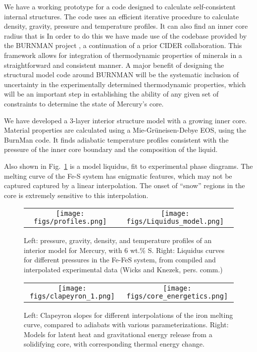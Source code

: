 We have a working prototype for a code designed to calculate self-consistent
internal structures. The code uses an efficient iterative procedure to
calculate density, gravity, pressure and temperature profiles. It can also find
an inner core radius that is In order to do this we have made use of the
codebase provided by the BURNMAN project \citep{Cottaar2014}, a continuation
of a prior CIDER collaboration. This framework allows for integration of
thermodynamic properties of minerals in a straightforward and consistent
manner. A major benefit of designing the structural model code around BURNMAN
will be the systematic inclusion of uncertainty in the experimentally
determined thermodynamic properties, which will be an important step in
establishing the ability of any given set of constraints to determine the state
of Mercury’s core. 

We have developed a 3-layer interior structure model with a growing inner core.
Material properties are calculated using a Mie-Gr\"{u}neisen-Debye EOS, using the BurnMan
code. It finds adiabatic temperature profiles consistent with the pressure of the 
inner core boundary and the composition of the liquid. 

Also shown in Fig.~\ref{fig:interior_model} is a model liquidus, fit to experimental
phase diagrams. The melting curve of the Fe-S system has enigmatic features, which
may not be captured captured by a  linear interpolation. The onset of ``snow''
regions in the core is extremely sensitive to this interpolation.

 \begin{figure}[H] %
   \centering
\begin{tabular}{cc}
 \texttt{[image: figs/profiles.png]} &
 \texttt{[image: figs/Liquidus\_model.png]} \\
\end{tabular}
   \caption{ Left: pressure, gravity, density, and temperature profiles of an
interior model for Mercury, with 6 wt.\% S.  Right: Liquidus curves for different pressures in the Fe-FeS system, from compiled and interpolated experimental data (Wicks and Knezek, pers. comm.) }
  \label{fig:interior_model}
\end{figure}


 \begin{figure}[H] %
   \centering
\begin{tabular}{cc}
 \texttt{[image: figs/clapeyron\_1.png]} &
 \texttt{[image: figs/core\_energetics.png]} \\
\end{tabular}
\caption{Left: Clapeyron slopes for different interpolations of the iron
melting curve, compared to adiabats with various parameterizations.  Right:  Models
for latent heat and gravitational energy release from a solidifying core, with
corresponding thermal energy change.}
\label{fig:core_energy}
\end{figure}


